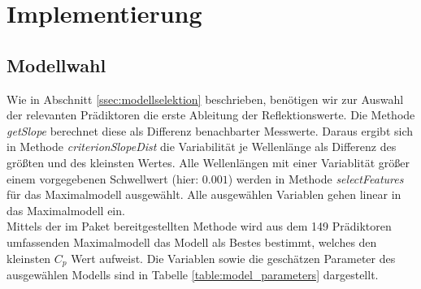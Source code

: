 \section{Implementierung}
\label{sec:implementation}
\subsection{Modellwahl}
\label{ssec:impl:modelwahl}

Wie in Abschnitt \ref{ssec:modellselektion} beschrieben, benötigen wir zur Auswahl der relevanten Prädiktoren die erste Ableitung der Reflektionswerte. Die Methode \textit{getSlope} berechnet diese als Differenz benachbarter Messwerte. Daraus ergibt sich in Methode \textit{criterionSlopeDist} die Variabilität je Wellenlänge als Differenz des größten und des kleinsten Wertes. Alle Wellenlängen mit einer Variablität größer einem vorgegebenen Schwellwert (hier: $0.001$) werden in Methode \textit{selectFeatures} für das Maximalmodell ausgewählt. Alle ausgewählen Variablen gehen linear in das Maximalmodell ein.\\
Mittels der im Paket  bereitgestellten Methode  wird aus dem 149 Prädiktoren umfassenden Maximalmodell das Modell als Bestes bestimmt, welches den kleinsten $C_p$ Wert aufweist. Die Variablen sowie die geschätzen Parameter des ausgewählen Modells sind in Tabelle \ref{table:model_parameters} dargestellt.\\

